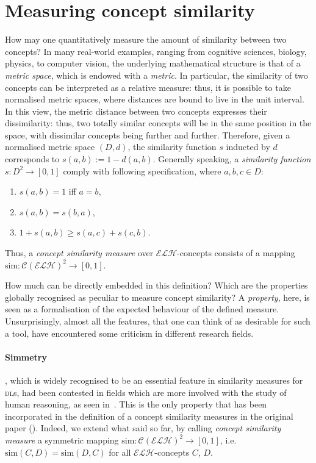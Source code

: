 \documentclass[]{llncs}
\theoremstyle{remark}
\newcommand{\elh}{\(\mathcal{ELH}{}\)}
\newcommand{\dl}{\textsc{dl}}
\begin{document}
  \section{Measuring concept similarity}

  How may one quantitatively measure the amount of similarity between two concepts?
  In many real-world examples, ranging from cognitive sciences, biology, physics, to computer vision, the underlying mathematical structure is that of a \emph{metric space}, which is endowed with a \emph{metric}.
  In particular, the similarity of two concepts can be interpreted as a relative measure: thus, it is possible to take normalised metric spaces, where distances are bound to live in the unit interval.
  In this view, the metric distance between two concepts expresses their dissimilarity: thus, two totally similar concepts will be in the same position in the space, with dissimilar concepts being further and further.
  Therefore, given a normalised metric space \((D,d)\), the similarity function \(s\) inducted by \(d\) corresponds to \(s(a,b) := 1 - d(a,b)\).
  Generally speaking, a \emph{similarity function} \(s \colon D^2 \to [0,1]\) comply with following specification, where \(a,b,c \in D\):
  \begin{enumerate}
    \item \(s(a,b) = 1\) iff \(a = b\),
    \item \(s(a,b) = s(b,a)\),
    \item \(1 + s(a,b) \ge s(a,c) + s(c,b)\).
  \end{enumerate}

  Thus, a \emph{concept similarity measure} over \elh-concepts consists of a mapping \(\mathrm{sim} \colon {\mathcal{C}(\mathcal{ELH})}^2 \to [0,1]\).

  How much can be directly embedded in this definition?
  Which are the properties globally recognised as peculiar to measure concept similarity?
  A \emph{property}, here, is seen as a formalisation of the expected behaviour of the defined measure.
  Unsurprisingly, almost all the features, that one can think of as desirable for such a tool, have encountered some criticism in different research fields.

  \paragraph{Simmetry}, which is widely recognised to be an essential feature in similarity measures for \dl{}s, had been contested in fields which are more involved with the study of human reasoning, as seen in~\cite{Tve77}.
  This is the only property that has been incorporated in the definition of a concept similarity measures in the original paper (\cite{LeTu12}).
  Indeed, we extend what said so far, by calling \emph{concept similarity measure} a symmetric mapping \(\mathrm{sim} \colon {\mathcal{C}(\mathcal{ELH})}^2 \to [0,1]\), i.e. \(\mathrm{sim}(C,D) = \mathrm{sim}(D,C)\) for all \elh-concepts \(C\), \(D\).
\end{document}
